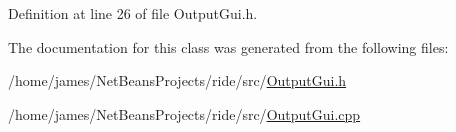 Definition at line 26 of file Output\-Gui.\-h.



The documentation for this class was generated from the following files\-:\begin{DoxyCompactItemize}
\item 
/home/james/\-Net\-Beans\-Projects/ride/src/\hyperlink{_output_gui_8h}{Output\-Gui.\-h}\item 
/home/james/\-Net\-Beans\-Projects/ride/src/\hyperlink{_output_gui_8cpp}{Output\-Gui.\-cpp}\end{DoxyCompactItemize}
